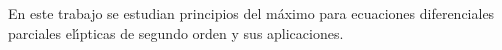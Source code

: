

En este trabajo se estudian principios del m\'{a}ximo para ecuaciones
diferenciales parciales el\'{\i}pticas de segundo orden y sus aplicaciones.
%
